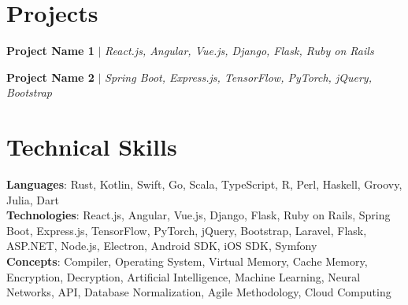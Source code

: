 \documentclass[letterpaper,11pt]{article}
\begin{document}
\resumeSubHeadingListEnd

\section{Projects}
\resumeSubHeadingListStart

    \resumeProjectHeading
    {\textbf{Project Name 1} $|$ \emph{React.js, Angular, Vue.js, Django, Flask, Ruby on Rails}}    {}
    \resumeItemListStart
    \resumeItemListEnd

    \resumeProjectHeading
    {\textbf{Project Name 2} $|$ \emph{Spring Boot, Express.js, TensorFlow, PyTorch, jQuery, Bootstrap}}{}
    \resumeItemListStart
    \resumeItemListEnd

\resumeSubHeadingListEnd

\section{Technical Skills}
    \begin{itemize}[leftmargin=0.15in, label={}]
	\small{\item{
		\textbf{Languages}{: Rust, Kotlin, Swift, Go, Scala, TypeScript, R, Perl, Haskell, Groovy, Julia, Dart} \\
		\textbf{Technologies}{: React.js, Angular, Vue.js, Django, Flask, Ruby on Rails, Spring Boot, Express.js, TensorFlow, PyTorch, jQuery, Bootstrap, Laravel, Flask, ASP.NET, Node.js, Electron, Android SDK, iOS SDK, Symfony} \\
		\textbf{Concepts}{: Compiler, Operating System, Virtual Memory, Cache Memory, Encryption, Decryption, Artificial Intelligence, Machine Learning, Neural Networks, API, Database Normalization, Agile Methodology, Cloud Computing}
	}}
    \end{itemize}
\end{document}
